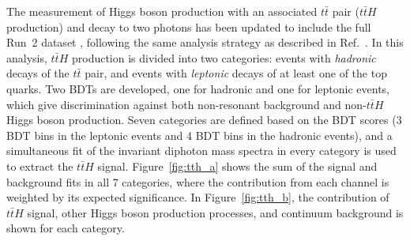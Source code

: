 \documentclass{moriond}
\def\ttbar{\ensuremath{t\bar{t}}\xspace}
\def\tth{\ensuremath{t\bar{t}H}\xspace}
\begin{document}
The measurement of Higgs boson production with an associated \ttbar pair (\tth production) and decay
to two photons has been updated to include the full Run~2 dataset \cite{ATLAS-CONF-2019-004},
following the same analysis strategy as described in Ref.~\cite{Aaboud:2018urx}. In this analysis, \tth production is
divided into two categories: events with {\itshape hadronic} decays of the $t\bar t$ pair, and
events with {\itshape leptonic} decays of at least one of the top quarks. Two BDTs are developed, one
for hadronic and one for leptonic events, which give discrimination against both non-resonant
background and non-\tth Higgs boson production. Seven categories are defined based on the BDT scores
(3 BDT bins in the leptonic events and 4 BDT bins in the hadronic events), and a 
simultaneous fit of the invariant diphoton mass spectra in every category is used to extract the
\tth signal.
Figure~\ref{fig:tth_a} shows the sum of the signal and background fits in all 7 categories, where
the contribution from each channel is weighted by its expected significance.
In Figure~\ref{fig:tth_b}, the contribution of \tth signal, other Higgs boson
production processes, and continuum background is shown for each category.
\end{document}
